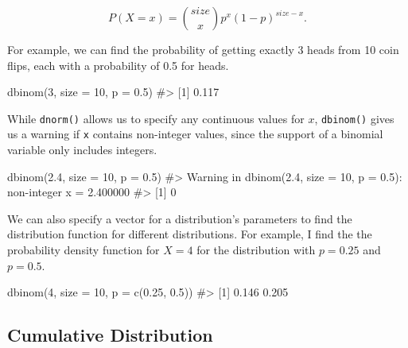 \documentclass[
  letterpaper,
]{latex/krantz}
\makeatletter
\newenvironment{Shaded}{\begin{snugshade}}{\end{snugshade}}
\newcommand{\AttributeTok}[1]{\textcolor[rgb]{0.40,0.45,0.13}{#1}}
\newcommand{\CommentTok}[1]{\textcolor[rgb]{0.37,0.37,0.37}{#1}}
\newcommand{\DecValTok}[1]{\textcolor[rgb]{0.68,0.00,0.00}{#1}}
\newcommand{\FloatTok}[1]{\textcolor[rgb]{0.68,0.00,0.00}{#1}}
\newcommand{\FunctionTok}[1]{\textcolor[rgb]{0.28,0.35,0.67}{#1}}
\newcommand{\NormalTok}[1]{\textcolor[rgb]{0.00,0.23,0.31}{#1}}
\newenvironment{kframe}{%
\medskip{}
\setlength{\fboxsep}{.8em}
 \def\at@end@of@kframe{}%
 \ifinner\ifhmode%
  \def\at@end@of@kframe{\end{minipage}}%
  \begin{minipage}{\columnwidth}%
 \fi\fi%
 \def\FrameCommand##1{\hskip\@totalleftmargin \hskip-\fboxsep
 \colorbox{shadecolor}{##1}\hskip-\fboxsep
     \hskip-\linewidth \hskip-\@totalleftmargin \hskip\columnwidth}%
 \MakeFramed {\advance\hsize-\width
   \@totalleftmargin\z@ \linewidth\hsize
   \@setminipage}}%
 {\par\unskip\endMakeFramed%
 \at@end@of@kframe}
\renewenvironment{Shaded}{\begin{kframe}}{\end{kframe}}
\makeatother
\begin{document}
\[ P(X = x) = \binom{size}{x} p^x (1-p)^{size-x}. \]

For example, we can find the probability of getting exactly 3 heads from
10 coin flips, each with a probability of 0.5 for heads.

\begin{Shaded}
\begin{Highlighting}[]
\FunctionTok{dbinom}\NormalTok{(}\DecValTok{3}\NormalTok{, }\AttributeTok{size =} \DecValTok{10}\NormalTok{, }\AttributeTok{p =} \FloatTok{0.5}\NormalTok{)}
\CommentTok{\#\textgreater{} [1] 0.117}
\end{Highlighting}
\end{Shaded}

While \texttt{dnorm()} allows us to specify any continuous values for
\(x\), \texttt{dbinom()} gives us a warning if \texttt{x} contains
non-integer values, since the support of a binomial variable only
includes integers.

\begin{Shaded}
\begin{Highlighting}[]
\FunctionTok{dbinom}\NormalTok{(}\FloatTok{2.4}\NormalTok{, }\AttributeTok{size =} \DecValTok{10}\NormalTok{, }\AttributeTok{p =} \FloatTok{0.5}\NormalTok{)}
\CommentTok{\#\textgreater{} Warning in dbinom(2.4, size = 10, p = 0.5): non{-}integer x = 2.400000}
\CommentTok{\#\textgreater{} [1] 0}
\end{Highlighting}
\end{Shaded}

We can also specify a vector for a distribution's parameters to find the
distribution function for different distributions. For example, I find
the the probability density function for \(X=4\) for the distribution
with \(p=0.25\) and \(p=0.5\).

\begin{Shaded}
\begin{Highlighting}[]
\FunctionTok{dbinom}\NormalTok{(}\DecValTok{4}\NormalTok{, }\AttributeTok{size =} \DecValTok{10}\NormalTok{, }\AttributeTok{p =} \FunctionTok{c}\NormalTok{(}\FloatTok{0.25}\NormalTok{, }\FloatTok{0.5}\NormalTok{))}
\CommentTok{\#\textgreater{} [1] 0.146 0.205}
\end{Highlighting}
\end{Shaded}

\subsection{\texorpdfstring{Cumulative Distribution
}{Cumulative Distribution   }}\label{cumulative-distribution}
\end{document}
